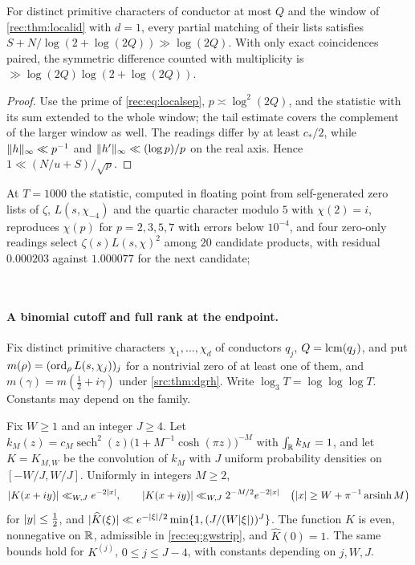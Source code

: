 \begin{corollary}\label{rec:cor:localmatch}
For distinct primitive characters of conductor at most $Q$ and the window of \cref{rec:thm:localid}
with $d=1$, every partial matching of their lists satisfies
$S+N/\log(2+\log(2Q))\gg\log(2Q)$. With only exact coincidences paired, the symmetric difference
counted with multiplicity is $\gg\log(2Q)\log(2+\log(2Q))$.
\end{corollary}

\begin{proof}
Use the prime of \eqref{rec:eq:localsep}, $p\asymp\log^2(2Q)$, and the statistic with its sum extended
to the whole window; the tail estimate covers the complement of the larger window as well. The
readings differ by at least $c_*/2$, while $\lVert h\rVert_\infty\ll p^{-1}$ and $\lVert h'\rVert_\infty\ll(\log p)/p$ on
the real axis. Hence $1\ll(N/u+S)/\sqrt p$.
\end{proof}

At $T=1000$ the statistic, computed in floating point from self-generated zero lists of $\zeta$,
$L(s,\chi_{-4})$ and the quartic character modulo $5$ with $\chi(2)=i$, reproduces $\chi(p)$ for
$p=2,3,5,7$ with errors below $10^{-4}$, and four zero-only readings select
$\zeta(s)L(s,\chi)^2$ among $20$ candidate products, with residual $0.000203$ against $1.000077$ for
the next candidate;
\begin{center}
\\
\end{center}

\paragraph{A binomial cutoff and full rank at the endpoint.}
Fix distinct primitive characters $\chi_1,\dots,\chi_d$ of conductors $q_j$, $Q=\operatorname{lcm}(q_j)$, and put
$m(\rho)=(\operatorname{ord}_\rho L(s,\chi_j))_j$ for a nontrivial zero of at least one of them, and
$m(\gamma)=m(\tfrac12+i\gamma)$ under \cref{src:thm:dgrh}. Write $\log_3T=\log\log\log T$. Constants
may depend on the family.

\begin{lemma}\label{rec:lem:binomkernel}
Fix $W\ge1$ and an integer $J\ge4$. Let $k_M(z)=c_M\operatorname{sech}^2(z)\bigl(1+M^{-1}\cosh(\pi z)\bigr)^{-M}$ with
$\int_{\mathbb{R}} k_M=1$, and let $K=K_{M,W}$ be the convolution of $k_M$ with $J$ uniform probability
densities on $[-W/J,W/J]$. Uniformly in integers $M\ge2$,
\[
 \lvert K(x+iy)\rvert\ll_{W,J}e^{-2\lvert x\rvert},\qquad \lvert K(x+iy)\rvert\ll_{W,J}2^{-M/2}e^{-2\lvert x\rvert}\quad
 \bigl(\lvert x\rvert\ge W+\pi^{-1}\operatorname{arsinh}M\bigr)
\]
for $\lvert y\rvert\le\tfrac12$, and $\lvert\widehat K(\xi)\rvert\ll e^{-\lvert\xi\rvert/2}\min\{1,(J/(W\lvert\xi\rvert))^J\}$. The function $K$
is even, nonnegative on $\mathbb{R}$, admissible in \eqref{rec:eq:gwstrip}, and $\widehat K(0)=1$. The same
bounds hold for $K^{(j)}$, $0\le j\le J-4$, with constants depending on $j,W,J$.
\end{lemma}

